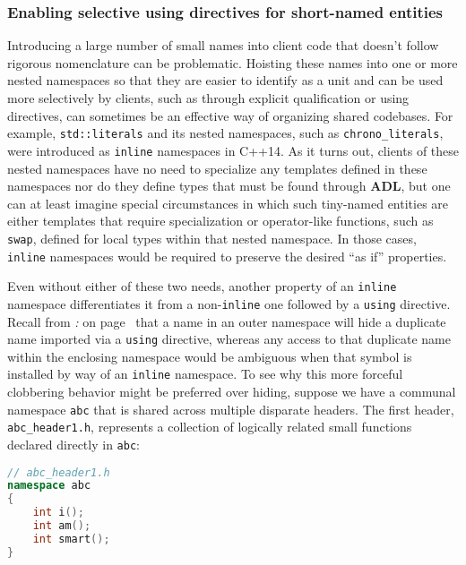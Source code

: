 \subsubsection[Enabling selective {\tt using} directives for short-named entities]{Enabling selective {\SubsubsecCode using} directives for short-named entities}\label{enabling-selective-using-directives-for-short-named-entities}

Introducing a large number of small names into client code that doesn't
follow rigorous nomenclature can be problematic. Hoisting these names
into one or more nested namespaces so that they are easier to identify
as a unit and can be used more selectively by clients, such as through
explicit qualification or using directives, can sometimes be an
effective way of organizing shared codebases. For example,
\texttt{std::literals} and its nested namespaces, such as
\texttt{chrono\_literals}, were introduced as \texttt{inline} namespaces
in C++14. As it turns out, clients of these nested namespaces have no
need to specialize any templates defined in these namespaces nor do they
define types that must be found through \textbf{ADL}, but one can at
least imagine special circumstances in which such tiny-named entities
are either templates that require specialization or operator-like
functions, such as \texttt{swap}, defined for local types within that
nested namespace. In those cases, \texttt{inline} namespaces would be
required to preserve the desired ``as if'' properties.

Even without either of these two needs, another property of an
\texttt{inline} namespace differentiates it from a non-\texttt{inline}
one followed by a \texttt{using} directive. Recall from
\textit{: } on page~\pageref{loss-of-access-to-duplicate-names-in-enclosing-namespace} that a name in an outer namespace will
hide a duplicate name imported via a \texttt{using} directive, whereas
any access to that duplicate name within the enclosing namespace would
be ambiguous when that symbol is installed by way of an \texttt{inline}
namespace. To see why this more forceful clobbering behavior might be
preferred over hiding, suppose we have a communal namespace \texttt{abc}
that is shared across multiple disparate headers. The first header,
\texttt{abc\_header1.h}, represents a collection of logically related
small functions declared directly in \texttt{abc}:

\begin{lstlisting}[language=C++]
// abc_header1.h
namespace abc
{
    int i();
    int am();
    int smart();
}
\end{lstlisting}
    
